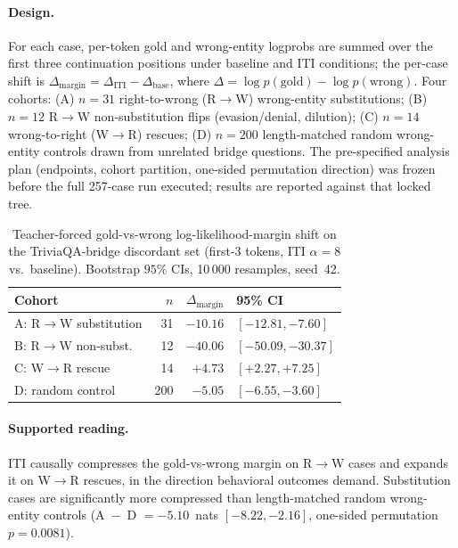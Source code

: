 \documentclass{article}
\begin{document}
\paragraph{Design.}
For each case, per-token gold and wrong-entity logprobs are summed over the first three continuation positions under baseline and ITI conditions; the per-case shift is $\Delta_\text{margin} = \Delta_\text{ITI} - \Delta_\text{base}$, where $\Delta = \log p(\text{gold}) - \log p(\text{wrong})$.
Four cohorts: (A) $n = 31$ right-to-wrong (R$\to$W) wrong-entity substitutions; (B) $n = 12$ R$\to$W non-substitution flips (evasion/denial, dilution); (C) $n = 14$ wrong-to-right (W$\to$R) rescues; (D) $n = 200$ length-matched random wrong-entity controls drawn from unrelated bridge questions.
The pre-specified analysis plan (endpoints, cohort partition, one-sided permutation direction) was frozen before the full 257-case run executed; results are reported against that locked tree.

\begin{table}[H]
\centering
\caption{Teacher-forced gold-vs-wrong log-likelihood-margin shift on the TriviaQA-bridge discordant set (first-$3$ tokens, ITI $\alpha = 8$ vs.\ baseline). Bootstrap $95\%$ CIs, 10\,000 resamples, seed~42.}
\label{tab:bridge_margin}
\vskip 0.1in
\small
\begin{tabular}{@{}lrrl@{}}
\toprule
\textbf{Cohort} & $n$ & $\Delta_\text{margin}$ & 95\% CI \\
\midrule
A: R$\to$W substitution     & 31 & $-10.16$ & $[-12.81, -7.60]$ \\
B: R$\to$W non-subst.       & 12 & $-40.06$ & $[-50.09, -30.37]$ \\
C: W$\to$R rescue           & 14 & $+4.73$  & $[+2.27, +7.25]$ \\
D: random control           & 200 & $-5.05$ & $[-6.55, -3.60]$ \\
\bottomrule
\end{tabular}
\vskip -0.1in
\end{table}

\paragraph{Supported reading.}
ITI causally compresses the gold-vs-wrong margin on R$\to$W cases and expands it on W$\to$R rescues, in the direction behavioral outcomes demand.
Substitution cases are significantly more compressed than length-matched random wrong-entity controls (A~$-$~D $= -5.10$~nats $[-8.22, -2.16]$, one-sided permutation $p = 0.0081$).
\end{document}
